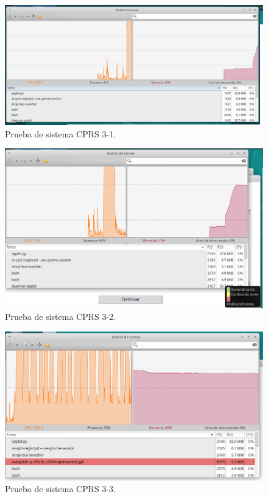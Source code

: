 
\begin{figure}[H]
    \centering
    \includegraphics[scale=0.60]{Capitulo4/Documentos/Casos_de_sistema/imagenes_casos/BusquedaEsteban.png}
    \caption{Prueba de sistema CPRS 3-1.}
    \label{Evidencia3-1}
\end{figure}

\begin{figure}[H]
    \centering
    \includegraphics[scale=0.60]{Capitulo4/Documentos/Casos_de_sistema/imagenes_casos/ResultadosEsteban.png}
    \caption{Prueba de sistema CPRS 3-2.}
    \label{Evidencia3-2}
\end{figure}

\begin{figure}[H]
    \centering
    \includegraphics[scale=0.60]{Capitulo4/Documentos/Casos_de_sistema/imagenes_casos/DockingEsteban.png}
    \caption{Prueba de sistema CPRS 3-3.}
    \label{Evidencia3-3}
\end{figure}

